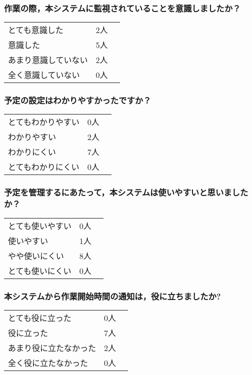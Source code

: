 \subsubsection*{作業の際，本システムに監視されていることを意識しましたか？}

\begin{table}[htb]
  \begin{tabular}{ll}
    とても意識した & 2人　\\
    意識した & 5人 \\
    あまり意識していない & 2人 \\
    全く意識していない & 0人
  \end{tabular}
\end{table}

\subsubsection*{予定の設定はわかりやすかったですか？}

\begin{table}[htb]
  \begin{tabular}{ll}
    とてもわかりやすい & 0人　\\
    わかりやすい & 2人 \\
    わかりにくい & 7人 \\
    とてもわかりにくい & 0人
  \end{tabular}
\end{table}

\subsubsection*{予定を管理するにあたって，本システムは使いやすいと思いましたか？}

\begin{table}[htb]
  \begin{tabular}{ll}
    とても使いやすい & 0人　\\
    使いやすい & 1人 \\
    やや使いにくい & 8人 \\
    とても使いにくい& 0人
  \end{tabular}
\end{table}

\subsubsection*{本システムから作業開始時間の通知は，役に立ちましたか?}

\begin{table}[htb]
  \begin{tabular}{ll}
    とても役に立った & 0人　\\
    役に立った & 7人 \\
    あまり役に立たなかった & 2人 \\
    全く役に立たなかった & 0人
  \end{tabular}
\end{table}

